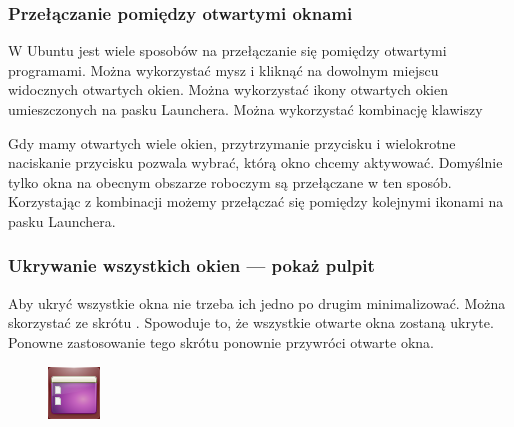 \subsubsection{Przełączanie pomiędzy otwartymi oknami}
W Ubuntu jest wiele sposobów na przełączanie się pomiędzy otwartymi programami. Można wykorzystać mysz i kliknąć na dowolnym miejscu widocznych otwartych okien. Można wykorzystać ikony otwartych okien umieszczonych na pasku Launchera. Można wykorzystać kombinację klawiszy 

Gdy mamy otwartych wiele okien, przytrzymanie przycisku  i wielokrotne naciskanie przycisku  pozwala wybrać, którą okno chcemy aktywować. Domyślnie tylko okna na obecnym obszarze roboczym są przełączane w ten sposób. Korzystając z kombinacji  możemy przełączać się pomiędzy kolejnymi ikonami na pasku Launchera.

\subsubsection{Ukrywanie wszystkich okien --- pokaż pulpit}
Aby ukryć wszystkie okna  nie trzeba ich jedno po drugim minimalizować. Można skorzystać ze skrótu . Spowoduje to, że wszystkie otwarte okna zostaną ukryte. Ponowne zastosowanie tego skrótu ponownie przywróci otwarte okna.

\begin{figure}
	\vspace{-10pt}	
	\includegraphics[width=\linewidth]{images/ikony_pokaz_pulpit.png}
\end{figure}

